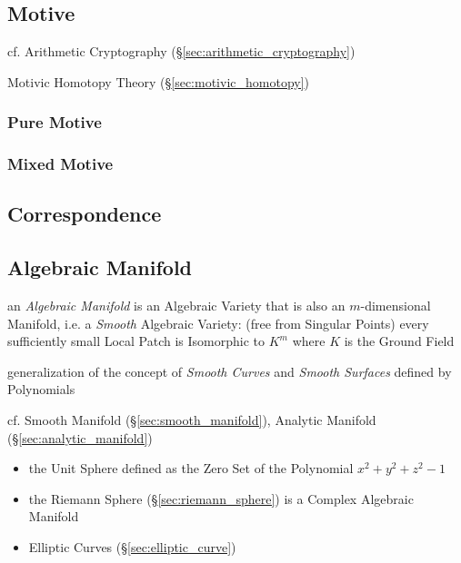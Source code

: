 \subsection{Motive}\label{sec:motive}

cf. Arithmetic Cryptography (\S\ref{sec:arithmetic_cryptography})

Motivic Homotopy Theory (\S\ref{sec:motivic_homotopy})



\subsubsection{Pure Motive}\label{sec:pure_motive}

\subsubsection{Mixed Motive}\label{sec:mixed_motive}



\subsection{Correspondence}\label{sec:variety_correspondence}

\subsection{Algebraic Manifold}\label{sec:algebraic_manifold}

an \emph{Algebraic Manifold} is an Algebraic Variety that is also an
$m$-dimensional Manifold, i.e. a \emph{Smooth} Algebraic Variety:
(free from Singular Points) every sufficiently small Local Patch is Isomorphic
to $K^m$ where $K$ is the Ground Field

generalization of the concept of \emph{Smooth Curves} and \emph{Smooth
  Surfaces} defined by Polynomials

cf. Smooth Manifold (\S\ref{sec:smooth_manifold}), Analytic Manifold
(\S\ref{sec:analytic_manifold})

\begin{itemize}
  \item the Unit Sphere defined as the Zero Set of the Polynomial
    $x^2 + y^2 + z^2 - 1$
  \item the Riemann Sphere (\S\ref{sec:riemann_sphere}) is a Complex Algebraic
    Manifold
  \item Elliptic Curves (\S\ref{sec:elliptic_curve})
\end{itemize}



